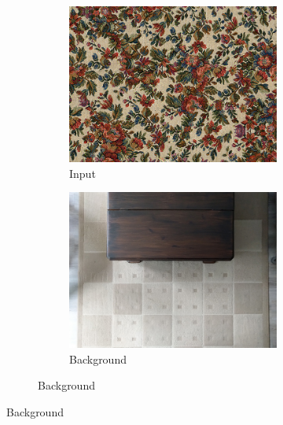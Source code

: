 \begin{figure}[]
    \centering    
    \begin{subfigure}{\textwidth}
        \centering
        \begin{subfigure}{0.24\textwidth}
            \centering
            \includegraphics[width=\textwidth]{images/04-experiment02/carpet/flowers/target.jpg}
            \caption*{Input}
        \end{subfigure}
        \hfill
        \begin{subfigure}{0.24\textwidth}
            \centering
            \includegraphics[width=\textwidth]{images/04-experiment02/carpet/bg.jpg}
            \caption*{Background}

\end{subfigure}
\end{subfigure}
\end{figure}
